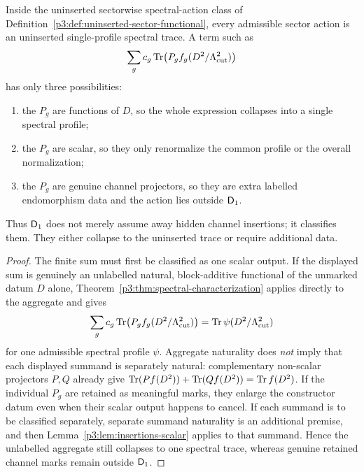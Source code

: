 \documentclass[12pt,a4paper]{article}
\begin{document}
\begin{corollary}
\label{p3:cor:no-channel-profiles}
Inside the uninserted sectorwise spectral-action class of
Definition~\ref{p3:def:uninserted-sector-functional}, every admissible sector action is an
uninserted single-profile spectral trace.  A term such as
\[
        \sum_g c_g\operatorname{Tr}\!\left(P_g f_g(D^2/\Lambda_{\mathrm{cut}}^2)\right)
\]
has only three possibilities:
\begin{enumerate}[label=(\roman*),leftmargin=2.1em]
\item the \(P_g\) are functions of \(D\), so the whole expression collapses into a single
spectral profile;
\item the \(P_g\) are scalar, so they only renormalize the common profile or the overall
normalization;
\item the \(P_g\) are genuine channel projectors, so they are extra labelled endomorphism
data and the action lies outside \(\mathsf{D}_1\).
\end{enumerate}
Thus \(\mathsf{D}_1\) does not merely assume away hidden channel insertions; it classifies them.
They either collapse to the uninserted trace or require additional data.
\end{corollary}

\begin{proof}
The finite sum must first be classified as one scalar output.  If the displayed
sum is genuinely an unlabelled natural, block-additive functional of the
unmarked datum \(D\) alone, Theorem~\ref{p3:thm:spectral-characterization}
applies directly to the aggregate and gives
\[
 \sum_g c_g\operatorname{Tr}\!\left(P_g f_g(D^2/\Lambda_{\mathrm{cut}}^2)\right)
 =\operatorname{Tr}\psi(D^2/\Lambda_{\mathrm{cut}}^2)
\]
for one admissible spectral profile \(\psi\).  Aggregate naturality does
\emph{not} imply that each displayed summand is separately natural: complementary
non-scalar projectors \(P,Q\) already give
\(\operatorname{Tr}(Pf(D^2))+\operatorname{Tr}(Qf(D^2))=\operatorname{Tr} f(D^2)\).  If the individual \(P_g\) are
retained as meaningful marks, they enlarge the constructor datum even when
their scalar output happens to cancel.  If each summand is to be classified
separately, separate summand naturality is an additional premise, and then
Lemma~\ref{p3:lem:insertions-scalar} applies to that summand.  Hence the
unlabelled aggregate still collapses to one spectral trace, whereas genuine
retained channel marks remain outside \(\mathsf{D}_1\).
\end{proof}
\end{document}
